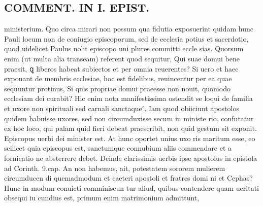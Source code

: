 \documentclass{article}
\begin{document}
\begin{pages}
\section*{COMMENT. IN I. EPIST. }\pstart ministerium. Quo circa mirari non possum qua fidutia exposuerint quidam hunc Pauli locum non de coniugio episcoporum, sed de ecclesia potius et sacerdotio, quod uidelicet Paulus nolit episcopo uni plures committi eccle sias. Quorsum enim (ut multa alia transeam) referent quod sequitur, Qui suae domui bene praesit, ꝗ liberos habeat subiectos et per omnia reuerentes? Si uero et haec exponant de membris ecclesiae, hoc est fidelibus, reuincentur per ea quae sequuntur protinus, Si quis propriae domui praeesse non nouit, quomodo ecclesiam dei curabit? Hic enim nota manifestissima ostendit se loqui de familia et uxore non spirituali sed carnali sanctaque ́. Iam quod obiiciunt apostolos quidem habuisse uxores, sed non circumduxisse secum in ministe rio, confutatur ex hoc loco, qui palam quid fieri debeat praescribit, non quid gestum sit exponit. Episcopus uerbi dei minister est. At hunc oportet unius uxo ris maritum esse, eo scilicet quia episcopus est, sanctumque connubium aliis commendare et a fornicatio ne absterrere debet. Deinde clarissimis uerbis ipse apostolus in epistola ad Corinth. 9.cap. An non habemus, ait, potestatem sororem mulierem circumducen di quemadmodum et caeteri apostoli et fratres domi ni et Cephas? Hunc in modum conuicti comminiscun tur aliud, quibus contendere quam ueritati obsequi iu cundius est, primum enim matrimonium admittunt,  \pend

\end{pages}
\end{document}
